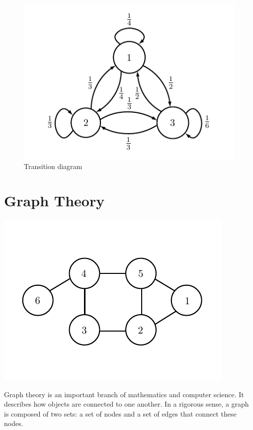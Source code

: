 \begin{figure}[h!]
\begin{center}
\includegraphics[scale = 1]{./Figures/markov2}
\end{center}
\caption{Transition diagram}
\end{figure}

\newpage

\section*{Graph Theory}
\begin{center}
\includegraphics[scale = .8]{./Figures/graphExample}
\end{center}

Graph theory is an important branch of mathematics and computer science. It describes how objects are connected to one another. In a rigorous sense, a graph is composed of two sets: a set of nodes and a set of edges that connect these nodes. 

